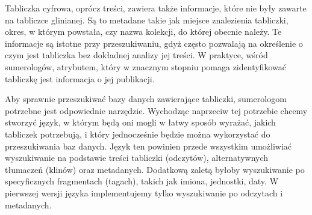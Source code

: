 Tabliczka cyfrowa, oprócz treści, zawiera także informacje, które nie były zawarte na tabliczce glinianej. Są to metadane takie jak miejsce znalezienia tabliczki, okres, w którym powstała, czy nazwa kolekcji, do której obecnie należy. Te informacje są istotne przy przeszukiwaniu, gdyż często pozwalają na określenie o czym jest tabliczka bez dokładnej analizy jej treści. W praktyce, wśród sumerologów, atrybutem, który w znacznym stopniu pomaga zidentyfikować tabliczkę jest informacja o jej publikacji.



Aby sprawnie przeszukiwać bazy danych zawierające tabliczki, sumerologom potrzebne jest odpowiednie narzędzie.
Wychodząc naprzeciw tej potrzebie chcemy stworzyć język, w którym będą oni mogli w łatwy sposób wyrażać, jakich tabliczek potrzebują, i który jednocześnie będzie można wykorzystać do przeszukiwania baz danych. Język ten powinien przede wszystkim umożliwiać wyszukiwanie na podstawie treści tabliczki (odczytów), alternatywnych tłumaczeń (klinów)
oraz metadanych.
Dodatkową zaletą byłoby wyszukiwanie po specyficznych fragmentach (tagach), takich jak imiona, jednostki, daty.
W pierwszej wersji języka implementujemy tylko wyszukiwanie po odczytach i metadanych.